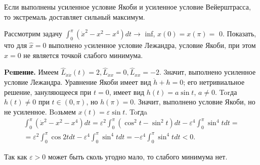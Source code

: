 \begin{task}
    \begin{theorem}
        Если выполнены усиленное
        условие Якоби и усиленное условие Вейерштрасса, то экстремаль доставляет
        сильный максимум.
    \end{theorem}

    Рассмотрим задачу $\int_0^\pi\left(\dot{x}^2-x^2-x^4\right) d t \rightarrow$ inf, $x(0)=x(\pi)=$ 0.
    Показать, что для $\hat{x}=0$ выполнено yсиленное условие Лежандра, условие Якоби,
    при этом $\hat{x}=0$ не является точкой слабого минимума.

    \textbf{Peшение.} Имеем $\hat{L}_{\dot{x} \dot{x}}(t)=2, \hat{L}_{\dot{x} x}=0, \hat{L}_{x x}=-2$. 3начит, выполнено усиленное условие Лежандра. Уравнение Якоби имеет вид $\ddot{h}+h=0$; его нетривиальное решение, зануляющееся при $t=0$, имеет вид $h(t)=a \sin t$, $a \neq 0$. Torда $h(t) \neq 0$ при $t \in(0, \pi)$, но $h(\pi)=0$. Значит, выполнено условие Якоби, но не усиленное.
    Boзьмем $x(t)=\varepsilon \sin t$. Toгдa
    $$
        \begin{gathered}
            \int_0^\pi\left(\dot{x}^2-x^2-x^4\right) d t=\varepsilon^2 \int_0^\pi\left(\cos ^2 t-\sin ^2 t\right) d t-\varepsilon^4 \int_0^\pi \sin ^4 t d t= \\
            =\varepsilon^2 \int_0^\pi \cos 2 t d t-\varepsilon^4 \int_0^\pi \sin ^4 t d t=-\varepsilon^4 \int_0^\pi \sin ^4 t d t<0 .
        \end{gathered}
    $$

    Так как $\varepsilon>0$ может быть сколь угодно мало, то слабого минимума нет.
\end{task}